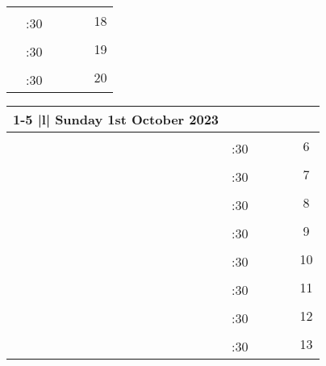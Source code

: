 \documentclass[10pt, a5paper, final, oneside]{memoir}
\newcommand{\grayline}{\arrayrulecolor{lightgray}\cline{1-5}\arrayrulecolor{black}}
\begin{document}
\begin{tabularx}{\linewidth}{|c|c|X|X|X|c}
    & & & && \multirow{2}{*}{18}\\ 
    \grayline
    & :30 & & &&\\ \hline

    & & & && \multirow{2}{*}{19}\\ 
    \grayline
    & :30 & & &&\\ \hline
    
    & & & && \multirow{2}{*}{20}\\ 
    \grayline
    & :30 & & &&\\ \hline

\end{tabularx}

\newpage

\noindent
\begin{tabularx}{\linewidth}{|c|c|X|X|X|c}

    \cline{1-5}
    \multicolumn{5} {|l|} {Sunday 1st October 2023} \\
    \hline

    & & & && \multirow{2}{*}{6}\\ 
    \grayline
    & :30 & & &&\\ \hline

    & & & && \multirow{2}{*}{7}\\ 
    \grayline
    & :30 & & &&\\ \hline

    & & & && \multirow{2}{*}{8}\\ 
    \grayline
    & :30 & & &&\\ \hline

    & & & && \multirow{2}{*}{9}\\ 
    \grayline
    & :30 & & &&\\ \hline
    
    & & & && \multirow{2}{*}{10}\\ 
    \grayline
    & :30 & & &&\\ \hline

    & & & && \multirow{2}{*}{11}\\ 
    \grayline
    & :30 & & &&\\ \hline

    & & & && \multirow{2}{*}{12}\\ 
    \grayline
    & :30 & & &&\\ \hline

    & & & && \multirow{2}{*}{13}\\ 
    \grayline
    & :30 & & &&\\ \hline


\end{tabularx}
\end{document}
